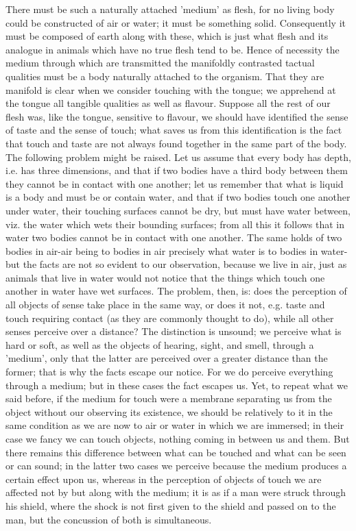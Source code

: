 There must be such a naturally attached 'medium' as flesh, for no
living body could be constructed of air or water; it must be something
solid. Consequently it must be composed of earth along with these,
which is just what flesh and its analogue in animals which have no
true flesh tend to be. Hence of necessity the medium through which
are transmitted the manifoldly contrasted tactual qualities must be
a body naturally attached to the organism. That they are manifold
is clear when we consider touching with the tongue; we apprehend at
the tongue all tangible qualities as well as flavour. Suppose all
the rest of our flesh was, like the tongue, sensitive to flavour,
we should have identified the sense of taste and the sense of touch;
what saves us from this identification is the fact that touch and
taste are not always found together in the same part of the body.
The following problem might be raised. Let us assume that every body
has depth, i.e. has three dimensions, and that if two bodies have
a third body between them they cannot be in contact with one another;
let us remember that what is liquid is a body and must be or contain
water, and that if two bodies touch one another under water, their
touching surfaces cannot be dry, but must have water between, viz.
the water which wets their bounding surfaces; from all this it follows
that in water two bodies cannot be in contact with one another. The
same holds of two bodies in air-air being to bodies in air precisely
what water is to bodies in water-but the facts are not so evident
to our observation, because we live in air, just as animals that live
in water would not notice that the things which touch one another
in water have wet surfaces. The problem, then, is: does the perception
of all objects of sense take place in the same way, or does it not,
e.g. taste and touch requiring contact (as they are commonly thought
to do), while all other senses perceive over a distance? The distinction
is unsound; we perceive what is hard or soft, as well as the objects
of hearing, sight, and smell, through a 'medium', only that the latter
are perceived over a greater distance than the former; that is why
the facts escape our notice. For we do perceive everything through
a medium; but in these cases the fact escapes us. Yet, to repeat what
we said before, if the medium for touch were a membrane separating
us from the object without our observing its existence, we should
be relatively to it in the same condition as we are now to air or
water in which we are immersed; in their case we fancy we can touch
objects, nothing coming in between us and them. But there remains
this difference between what can be touched and what can be seen or
can sound; in the latter two cases we perceive because the medium
produces a certain effect upon us, whereas in the perception of objects
of touch we are affected not by but along with the medium; it is as
if a man were struck through his shield, where the shock is not first
given to the shield and passed on to the man, but the concussion of
both is simultaneous. 


